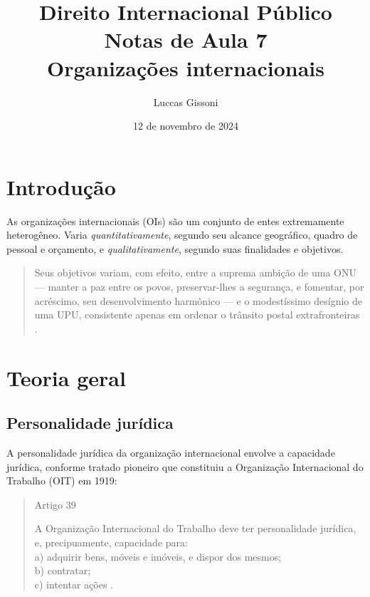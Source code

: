 \documentclass{article}
\title{%
  Direito Internacional Público \\
  \Large Notas de Aula 7\\
  \Large Organizações internacionais\\
  }
\author{Luccas Gissoni}
\date{12 de novembro de 2024}
\begin{document}
\maketitle
\tableofcontents

\section{Introdução}

As organizações internacionais (OIs) são um conjunto de entes extremamente heterogêneo. Varia \textit{quantitativamente}, segundo seu alcance geográfico, quadro de pessoal e orçamento, e \textit{qualitativamente}, segundo suas finalidades e objetivos.

\begin{quote}
    Seus objetivos variam, com efeito, entre a suprema ambição de uma ONU — manter a paz entre os povos, preservar-lhes a segurança, e fomentar, por acréscimo, seu desenvolvimento harmônico — e o modestíssimo desígnio de uma UPU, consistente apenas em ordenar o trânsito postal extrafronteiras \cite[p. 104]{rezek_direito_2024}.
\end{quote}

\section{Teoria geral}

\subsection{Personalidade jurídica}

A personalidade jurídica da organização internacional envolve a capacidade jurídica, conforme tratado pioneiro que constituiu a Organização Internacional do Trabalho (OIT) em 1919:

\begin{quote}
    \begin{center}
          Artigo 39\\
    \end{center}
    A Organização Internacional do Trabalho deve ter personalidade jurídica, e,
    precipuamente, capacidade para:\\
    a) adquirir bens, móveis e imóveis, e dispor dos mesmos;\\
    b) contratar;\\
    c) intentar ações \cite{oit_constituicao_1919}.
\end{quote}
\end{document}
